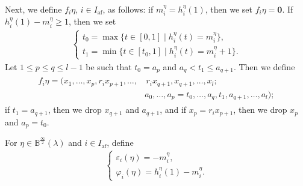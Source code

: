 \documentclass[10pt]{amsart}
\theoremstyle{definition}\newtheorem{defi}[theo]{Definition}
\theoremstyle{remark}\newtheorem{rema}[theo]{Remark}
\newcommand\bm[1]{\boldsymbol{#1}}
\newcommand{\si}{\frac{\infty}{2}}
\DeclareMathOperator{\af}{af}
\begin{document}
Next, we define $f_i \eta$, $i \in I_{\af}$, as follows: 
if $m_i^{\eta} = h_i^{\eta}(1)$, then we set $f_i \eta = \bm{0}$. 
If $h_i^{\eta}(1) - m_i^{\eta} \geq 1$, then we set
\begin{align} \label{eq:f_i-t}
\begin{cases}
t_0 = \max \{ t \in [0,1] \mid h_i^{\eta}(t) = m_i^{\eta} \} , \\%
t_1 = \min \{ t \in [t_0,1] \mid h_i^{\eta}(t) = m_i^{\eta} + 1 \} .
\end{cases}
\end{align}
Let 
$1 \leq p \leq q \leq l-1$
be such that
$t_0 = a_p$ and $a_q < t_1 \leq a_{q+1}$. 
Then we define
\begin{align}
\begin{split}
f_i \eta 
= 
(x_1 , \ldots , x_p , r_i x_{p+1} , \ldots , 
& \, r_i x_{q+1} , x_{q+1} , \ldots , x_l ; \\ 
&a_0 , \ldots , a_p = t_0 , \ldots , a_q , t_1 , a_{q+1} , \ldots , a_l ) ;
\end{split}
\end{align}
if $t_1 = a_{q+1}$, 
then we drop $x_{q+1}$ and $a_{q+1}$, 
and if $x_p = r_i x_{p+1}$, 
then we drop $x_p$ and $a_p = t_0$.

For $\eta \in \mathbb{B}^{\si}(\lambda)$ and $i \in I_{\af}$, define
\begin{align} \label{eq:path-eps-phi}
\begin{cases}
\varepsilon_i(\eta) = -m_i^{\eta} , \\%
\varphi_i(\eta) = h_i^{\eta}(1) - m_i^{\eta} .
\end{cases}
\end{align}
\end{document}
